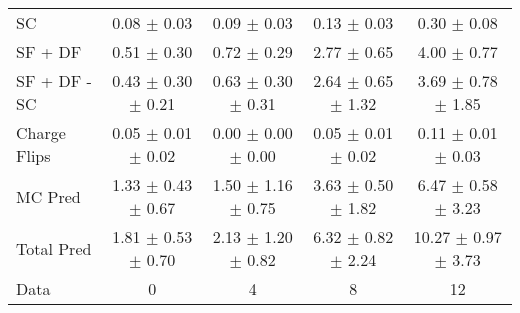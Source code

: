 \begin{tabular}{l|cccc}
                                 SC &  0.08 $\pm$  0.03 &  0.09 $\pm$  0.03 &  0.13 $\pm$  0.03 &  0.30 $\pm$  0.08 \\
                            SF + DF &  0.51 $\pm$  0.30 &  0.72 $\pm$  0.29 &  2.77 $\pm$  0.65 &  4.00 $\pm$  0.77 \\
\hline
                       SF + DF - SC &  0.43 $\pm$  0.30 $\pm$  0.21 &  0.63 $\pm$  0.30 $\pm$  0.31 &  2.64 $\pm$  0.65 $\pm$  1.32 &  3.69 $\pm$  0.78 $\pm$  1.85 \\
\hline\hline
                       Charge Flips &  0.05 $\pm$  0.01 $\pm$  0.02 &  0.00 $\pm$  0.00 $\pm$  0.00 &  0.05 $\pm$  0.01 $\pm$  0.02 &  0.11 $\pm$  0.01 $\pm$  0.03 \\
\hline
                            MC Pred &  1.33 $\pm$  0.43 $\pm$  0.67 &  1.50 $\pm$  1.16 $\pm$  0.75 &  3.63 $\pm$  0.50 $\pm$  1.82 &  6.47 $\pm$  0.58 $\pm$  3.23 \\
\hline
                         Total Pred &  1.81 $\pm$  0.53 $\pm$  0.70 &  2.13 $\pm$  1.20 $\pm$  0.82 &  6.32 $\pm$  0.82 $\pm$  2.24 & 10.27 $\pm$  0.97 $\pm$  3.73 \\
\hline\hline
                               Data &     0 &     4 &     8 &    12 \\
\hline\hline
\end{tabular}

